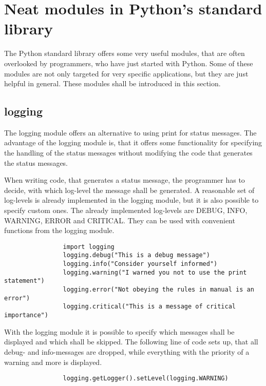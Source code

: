 	\section{Neat modules in Python's standard library}
		The Python standard library offers some very useful modules, that are often overlooked by programmers, who have just started with Python.
		Some of these modules are not only targeted for very specific applications, but they are just helpful in general.
		These modules shall be introduced in this section.

		\subsection{logging}
			\label{logging}
			The logging module offers an alternative to using {\normalfont \ttfamily print} for status messages.
			The advantage of the logging module is, that it offers some functionality for specifying the handling of the status messages without modifying the code that generates the status messages.

			When writing code, that generates a status message, the programmer has to decide, with which log-level the message shall be generated.
			A reasonable set of log-levels is already implemented in the logging module, but it is also possible to specify custom ones.
			The already implemented log-levels are {\normalfont \ttfamily DEBUG}, {\normalfont \ttfamily INFO}, {\normalfont \ttfamily WARNING}, {\normalfont \ttfamily ERROR} and {\normalfont \ttfamily CRITICAL}.
			They can be used with convenient functions from the logging module.
			\begin{verbatim}
				import logging
				logging.debug("This is a debug message")
				logging.info("Consider yourself informed")
				logging.warning("I warned you not to use the print statement")
				logging.error("Not obeying the rules in manual is an error")
				logging.critical("This is a message of critical importance")
			\end{verbatim}

			With the logging module it is possible to specify which messages shall be displayed and which shall be skipped.
			The following line of code sets up, that all debug- and info-messages are dropped, while everything with the priority of a warning and more is displayed.
			\begin{verbatim}
				logging.getLogger().setLevel(logging.WARNING)
			\end{verbatim}

